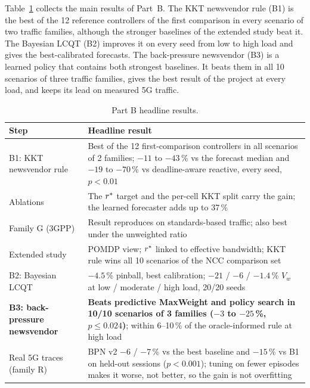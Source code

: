 Table~\ref{tab:b-summary} collects the main results of Part~B. The KKT newsvendor rule (B1) is the best of the 12 reference controllers of the first comparison in every scenario of two traffic families, although the stronger baselines of the extended study beat it. The Bayesian LCQT (B2) improves it on every seed from low to high load and gives the best-calibrated forecasts. The back-pressure newsvendor (B3) is a learned policy that contains both strongest baselines. It beats them in all 10 scenarios of three traffic families, gives the best result of the project at every load, and keeps its lead on measured 5G traffic.

\begin{table}[H]
\caption{Part B headline results.}
\label{tab:b-summary}
\centering\small
\renewcommand{\arraystretch}{1.2}
\begin{tabularx}{\textwidth}{>{\raggedright\arraybackslash}p{4.2cm}>{\raggedright\arraybackslash}X}
\toprule
Step & Headline result \\
\midrule
B1: KKT newsvendor rule & Best of the 12 first-comparison controllers in all scenarios of 2 families; $-11$ to $-43$\,\% vs the forecast median and $-19$ to $-70$\,\% vs deadline-aware reactive, every seed, $p < 0.01$ \\
Ablations & The $r^{\ast}$ target and the per-cell KKT split carry the gain; the learned forecaster adds up to 37\,\% \\
Family G (3GPP) & Result reproduces on standards-based traffic; also best under the unweighted ratio \\
Extended study & POMDP view; $r^{\ast}$ linked to effective bandwidth; KKT rule wins all 10 scenarios of the NCC comparison set \\
B2: Bayesian LCQT & $-4.5$\,\% pinball, best calibration; $-21$ / $-6$ / $-1.4$\,\% $V_w$ at low / moderate / high load, 20/20 seeds \\
\textbf{B3: back-pressure newsvendor} & \textbf{Beats predictive MaxWeight and policy search in 10/10 scenarios of 3 families ($-3$ to $-25$\,\%, $p \le 0.024$)}; within 6--10\,\% of the oracle-informed rule at high load \\
Real 5G traces (family R) & BPN v2 $-6$ / $-7$\,\% vs the best baseline and $-15$\,\% vs B1 on held-out sessions ($p < 0.001$); tuning on fewer episodes makes it worse, not better, so the gain is not overfitting \\
\bottomrule
\end{tabularx}
\end{table}
